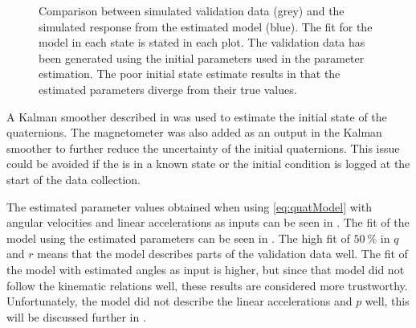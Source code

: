 \begin{figure}[htbp]
  \centering %
  \qquad
  \qquad
    \qquad
    \qquad
    \qquad
  \caption{\label{fig:angVelSim}%
    Comparison between simulated validation data (grey) and the simulated response from the estimated model (blue). The fit for the model in each state is stated in each plot. The validation data has been generated using the initial parameters used in the parameter estimation. The poor initial state estimate results in that the estimated parameters diverge from their true values.}
\end{figure}  

A Kalman smoother described in \citet{Wallin} was used to estimate the initial state of the quaternions. The magnetometer was also added as an output in the Kalman smoother to further reduce the uncertainty of the initial quaternions. This issue could be avoided if the \abbrROV is in a known state or the initial condition is logged at the start of the data collection.

The estimated parameter values obtained when using \eqref{eq:quatModel} with angular velocities and linear accelerations as inputs can be seen in . The fit of the model using the estimated parameters can be seen in . The high fit of $50\ \%$ in $q$ and $r$ means that the model describes parts of the validation data well. The fit of the model with estimated angles as input is higher, but since that model did not follow the kinematic relations well, these results are considered more trustworthy. Unfortunately, the model did not describe the linear accelerations and $p$ well, this will be discussed further in .


